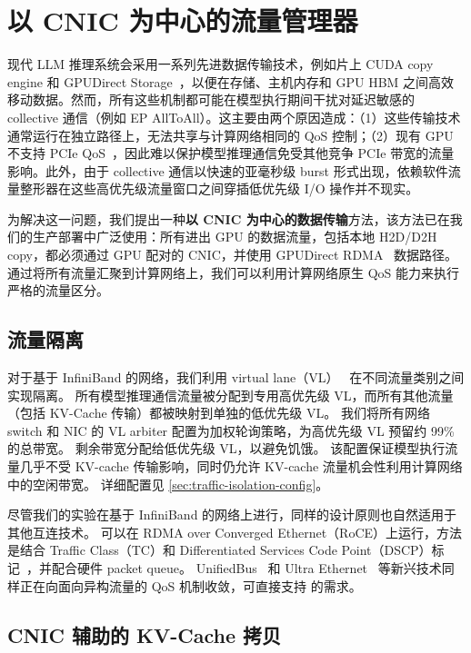 
\section{以 CNIC 为中心的流量管理器}
\label{sec:traffic-manager}

现代 LLM 推理系统会采用一系列先进数据传输技术，例如片上 CUDA copy engine 和 GPUDirect Storage~\cite{nvidia2026gds}，以便在存储、主机内存和 GPU HBM 之间高效移动数据。然而，所有这些机制都可能在模型执行期间干扰对延迟敏感的 collective 通信（例如 EP AllToAll）。这主要由两个原因造成：（1）这些传输技术通常运行在独立路径上，无法共享与计算网络相同的 QoS 控制；（2）现有 GPU 不支持 PCIe QoS~\cite{7723586}，因此难以保护模型推理通信免受其他竞争 PCIe 带宽的流量影响。此外，由于 collective 通信以快速的亚毫秒级 burst 形式出现，依赖软件流量整形器在这些高优先级流量窗口之间穿插低优先级 I/O 操作并不现实。


为解决这一问题，我们提出一种\textbf{以 CNIC 为中心的数据传输}方法，该方法已在我们的生产部署中广泛使用：所有进出 GPU 的数据流量，包括本地 H2D/D2H copy，都必须通过 GPU 配对的 CNIC，并使用 GPUDirect RDMA~\cite{nvidiaOverviewx2014} 数据路径。通过将所有流量汇聚到计算网络上，我们可以利用计算网络原生 QoS 能力来执行严格的流量区分。

\subsection{流量隔离}

对于基于 InfiniBand 的网络，我们利用 virtual lane（VL）~\cite{ibta-spec} 在不同流量类别之间实现隔离。
所有模型推理通信流量被分配到专用高优先级 VL，而所有其他流量（包括 KV-Cache 传输）都被映射到单独的低优先级 VL。
我们将所有网络 switch 和 NIC 的 VL arbiter 配置为加权轮询策略，为高优先级 VL 预留约 99\% 的总带宽。
剩余带宽分配给低优先级 VL，以避免饥饿。
该配置保证模型执行流量几乎不受 KV-cache 传输影响，同时仍允许 KV-cache 流量机会性利用计算网络中的空闲带宽。
详细配置见 \autoref{sec:traffic-isolation-config}。


尽管我们的实验在基于 InfiniBand 的网络上进行，同样的设计原则也自然适用于其他互连技术。
\sysname 可以在 RDMA over Converged Ethernet（RoCE）上运行，方法是结合 Traffic Class（TC）和 Differentiated Services Code Point（DSCP）标记~\cite{sigcomm16:rocev2,Carpenter2002DifferentiatedSI}，并配合硬件 packet queue。
UnifiedBus~\cite{unifiedbus} 和 Ultra Ethernet~\cite{uec-spec} 等新兴技术同样正在向面向异构流量的 QoS 机制收敛，可直接支持 \sysname 的需求。

\subsection{CNIC 辅助的 KV-Cache 拷贝}

